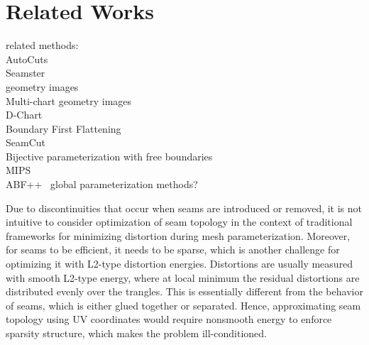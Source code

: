 
\section{Related Works}

related methods:\\
AutoCuts~\cite{Poranne2017Autocuts}\\
Seamster~\cite{Sheffer2002Seamster}\\
geometry images~\cite{Gu2002Geometry}\\
Multi-chart geometry images~\cite{Snyder2003Multi}\\
D-Chart~\cite{Julius2005D}\\
Boundary First Flattening~\cite{Sawhney:2017}\\
SeamCut~\cite{Lucquin:2017}\\
Bijective parameterization with free boundaries~\cite{Smith2015Bijective}\\
MIPS~\cite{Hormann2000MIPS}\\
ABF++~\cite{Sheffer2005ABFPP}
global parameterization methods?

Due to discontinuities that occur when seams are introduced or removed, it is not intuitive to consider optimization of seam topology in the context of traditional frameworks for minimizing distortion during mesh parameterization.
%
Moreover, for seams to be efficient, it needs to be sparse, which is another challenge for optimizing it with L2-type distortion energies.
Distortions are usually measured with smooth L2-type energy, where at local minimum the residual distortions are distributed evenly over the trangles. This is essentially different from the behavior of seams, which is either glued together or separated. Hence, approximating seam topology using UV coordinates would require nonsmooth energy to enforce sparsity structure, which makes the problem ill-conditioned.

